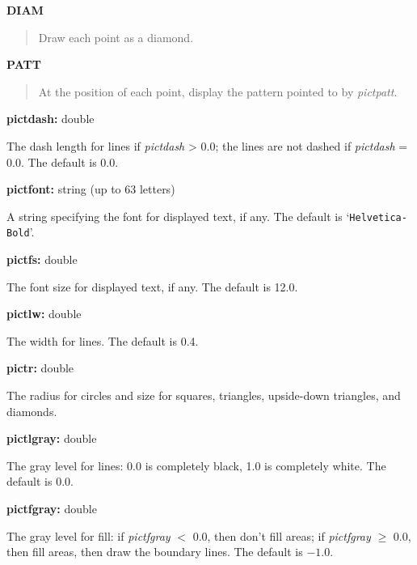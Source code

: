 \documentclass{book}
\newcommand\Texinfocommandstyletextvar[1]{{\normalfont{}\textsl{#1}}}%
\renewcommand{\_}{\Texinfounderscore\discretionary{}{}{}}
\begin{document}
\textbf{DIAM}
\begin{quote}
Draw each point as a diamond.
\end{quote}
%

\textbf{PATT}
\begin{quote}
At the position of each point, display the pattern pointed to by \Texinfocommandstyletextvar{pict\_patt}.
\end{quote}
%

\noindent{}\textbf{pict\_dash:} double

The dash
%
%
length for lines if \Texinfocommandstyletextvar{pict\_dash} > 0.0;
the lines are not dashed if \Texinfocommandstyletextvar{pict\_dash} = 0.0.
The default is 0.0.

\noindent{}\textbf{pict\_font:} string (up to 63 letters)

A string specifying the font
%
for displayed text, if any.
The default is `\texttt{Helvetica-Bold}'.

\noindent{}\textbf{pict\_fs:} double

The font size
%
%
for displayed text, if any.
The default is 12.0.

\noindent{}\textbf{pict\_lw:} double

The width for lines.
%
%
%
The default is 0.4.

\noindent{}\textbf{pict\_r:} double
%
%

The radius for circles and size for squares, triangles, upside-down triangles, and
diamonds.

\noindent{}\textbf{pict\_lgray:} double

The gray level
%
%
%
for lines: 0.0 is completely black, 1.0 is completely white.
The default is 0.0.

\noindent{}\textbf{pict\_fgray:} double
%
%
%
%

The gray level for fill:  if \Texinfocommandstyletextvar{pict\_fgray} $<$ 0.0, then don't fill areas;
if \Texinfocommandstyletextvar{pict\_fgray} $\ge$ 0.0, then fill areas, then draw the boundary lines.
The default is $-1.0$.
\end{document}
